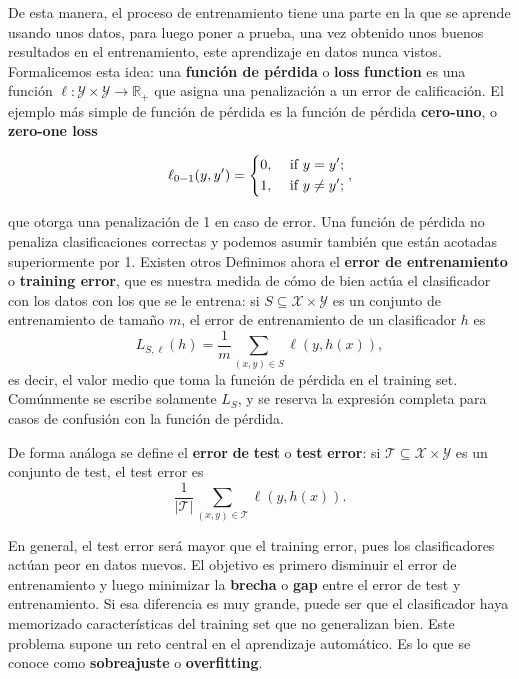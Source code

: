 \documentclass[a4paper, 12pt, oneside]{book}
\begin{document}
De esta manera, el proceso de entrenamiento tiene una parte en la que se aprende usando unos datos,
para luego poner a prueba, una vez obtenido unos buenos resultados en el entrenamiento, 
este aprendizaje en datos nunca vistos. Formalicemos esta idea: una \textbf{función de
pérdida} o \textbf{loss} \textbf{function} es una función \(\ell : \mathcal{Y} \times \mathcal{Y}  \to \mathbb{R}_+ \) que asigna una penalización a un error de calificación.
El ejemplo más simple de función de pérdida es la función de pérdida \textbf{cero-uno}, o
\textbf{zero-one loss}

\[
    \ell_{0-1}(y, y^{\prime} ) = \begin{dcases}
        0, &\text{ if } y = y^{\prime}  ;\\
        1, &\text{ if } y \neq y^{\prime}  ;\\
    \end{dcases}
,\]

que otorga una penalización de 1 en caso de error. Una función de pérdida no penaliza 
clasificaciones correctas y podemos asumir también que están acotadas superiormente por 1.
Existen otros 
Definimos ahora el \textbf{error de entrenamiento} o \textbf{training error}, que es 
nuestra medida de cómo de bien actúa el clasificador con los datos con los que se le
entrena: si \(S \subseteq \mathcal{X} \times \mathcal{Y} \) es un conjunto de entrenamiento
de tamaño \(m\), el error de entrenamiento de un clasificador \(h\) es 
\[
    L_{S, \ell}(h) = \frac{1}{m}\sum_{(x, y)\in S}\ell (y, h(x)) 
,\]  
es decir, el valor medio que toma la función de pérdida en el training set.
Comúnmente se escribe solamente \(L_S\), y se reserva la expresión completa para casos de confusión con la función de pérdida.

De forma análoga se define el \textbf{error} \textbf{de} \textbf{test} o \textbf{test} 
\textbf{error}: si \(\mathcal{T} \subseteq \mathcal{X}  \times \mathcal{Y} \) es un
conjunto de test, el test error es
\[
    \frac{1}{\vert \mathcal{T}  \vert }\sum_{(x,y)\in \mathcal{T} }\ell (y, h(x)) 
.\]

En general, el test error será mayor que el training error, pues los clasificadores
actúan peor en datos nuevos. El objetivo es primero disminuir el error de entrenamiento
y luego minimizar la \textbf{brecha} o \textbf{gap} entre el error de test y 
entrenamiento. Si esa diferencia es muy grande, puede ser que el clasificador
haya memorizado características del training set que no generalizan bien. Este problema supone un reto central en el aprendizaje automático. Es lo que se conoce como
\textbf{sobreajuste} o \textbf{overfitting}.
\end{document}
